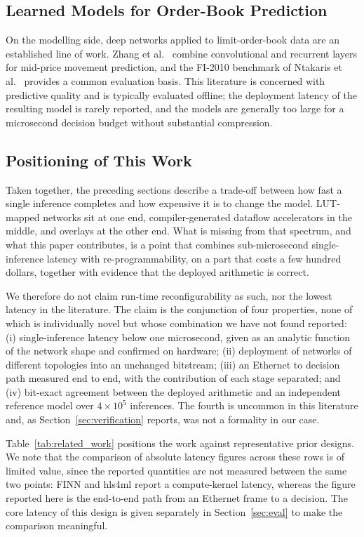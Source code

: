 \documentclass[final,5p,times,twocolumn]{elsarticle}
\begin{document}
\subsection{Learned Models for Order-Book Prediction}
On the modelling side, deep networks applied to limit-order-book data are an
established line of work. Zhang et al.~\cite{Zhang2019} combine convolutional
and recurrent layers for mid-price movement prediction, and the FI-2010
benchmark of Ntakaris et al.~\cite{Ntakaris2018} provides a common evaluation
basis. This literature is concerned with predictive quality and is typically
evaluated offline; the deployment latency of the resulting model is rarely
reported, and the models are generally too large for a microsecond decision
budget without substantial compression.

\subsection{Positioning of This Work}
Taken together, the preceding sections describe a trade-off between how fast a
single inference completes and how expensive it is to change the model.
LUT-mapped networks sit at one end, compiler-generated dataflow accelerators in
the middle, and overlays at the other end. What is missing from that spectrum,
and what this paper contributes, is a point that combines sub-microsecond
single-inference latency with re-programmability, on a part that costs a few
hundred dollars, together with evidence that the deployed arithmetic is correct.

We therefore do not claim run-time reconfigurability as such, nor the lowest
latency in the literature. The claim is the conjunction of four properties, none
of which is individually novel but whose combination we have not found reported:
(i) single-inference latency below one microsecond, given as an analytic
function of the network shape and confirmed on hardware; (ii) deployment of
networks of different topologies into an unchanged bitstream; (iii) an Ethernet
to decision path measured end to end, with the contribution of each stage
separated; and (iv) bit-exact agreement between the deployed arithmetic and an
independent reference model over $4\times10^{5}$ inferences. The fourth is
uncommon in this literature and, as Section~\ref{sec:verification} reports, was
not a formality in our case.

Table~\ref{tab:related_work} positions the work against representative prior
designs. We note that the comparison of absolute latency figures across these
rows is of limited value, since the reported quantities are not measured between
the same two points: FINN and hls4ml report a compute-kernel latency, whereas the
figure reported here is the end-to-end path from an Ethernet frame to a decision.
The core latency of this design is given separately in
Section~\ref{sec:eval} to make the comparison meaningful.
\end{document}
